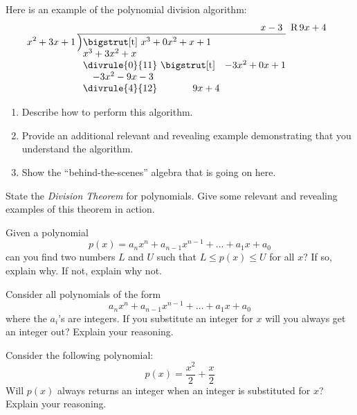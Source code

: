 \documentclass[nooutcomes]{ximera}
\begin{document}
\begin{problem}Here is an example of the polynomial division algorithm:
\[
x^2 + 3x + 1\,\begin{tabular}[b]{@{}r@{}r} 
$x-3$~~&\, R\,$9x+4$\\ 
\cline{1-1}
\Big)\begin{tabular}[t]{@{}l@{}} \bigstrut[t] $x^3 + 0x^2 + x + 1$\\ 
$x^3 + 3x^2 + x$ \\ 
\divrule{0}{11}  
\bigstrut[t]~~~$-3x^2 +0x + 1$\\
~~~$-3x^2-9x -3$\\
\divrule{4}{12}
~~~~~~~~~~$9x + 4$
\end{tabular}
\end{tabular}
\]
\begin{enumerate}
\item Describe how to perform this algorithm.
\item Provide an additional relevant and revealing example
  demonstrating that you understand the algorithm.
\item Show the ``behind-the-scenes'' algebra that is going on here.
\end{enumerate}
\end{problem} 

\begin{problem}State the \textit{Division Theorem} for polynomials. Give some
  relevant and revealing examples of this theorem in action.
\end{problem} 

\begin{problem}Given a polynomial
\[
p(x) = a_nx^n + a_{n-1}x^{n-1} + \dots + a_1 x+ a_0
\]
can you find two numbers $L$ and $U$ such that $L \le p(x) \le U$ for
all $x$? If so, explain why. If not, explain why not.
\end{problem} \begin{problem}Consider all polynomials of the form
\[
a_nx^n + a_{n-1}x^{n-1} + \dots + a_1 x+ a_0
\]
where the $a_i$'s are integers. If you substitute an integer for $x$
will you always get an integer out? Explain your reasoning.
\end{problem} \begin{problem}Consider the following polynomial:
\[
p(x) = \frac{x^2}{2}+\frac{x}{2}
\]
Will $p(x)$ always returns an integer when an integer is substituted
for $x$? Explain your reasoning.

\end{problem} 
\end{document}
